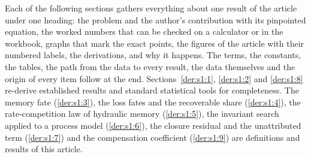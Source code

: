 Each of the following sections gathers everything about one result of the article under one heading: the problem and the author's contribution with its pinpointed equation, the worked numbers that can be checked on a calculator or in the workbook, graphs that mark the exact points, the figures of the article with their numbered labels, the derivations, and why it happens. The terms, the constants, the tables, the path from the data to every result, the data themselves and the origin of every item follow at the end. Sections~\ref{der:s1:1}, \ref{der:s1:2} and \ref{der:s1:8} re-derive established results \citep{vanGenuchten1980,Mualem1976} and standard statistical tools for completeness. The memory fate (\ref{der:s1:3}), the loss fates and the recoverable share (\ref{der:s1:4}), the rate-competition law of hydraulic memory (\ref{der:s1:5}), the invariant search applied to a process model (\ref{der:s1:6}), the closure residual and the unattributed term (\ref{der:s1:7}) and the compensation coefficient (\ref{der:s1:9}) are definitions and results of this article.
